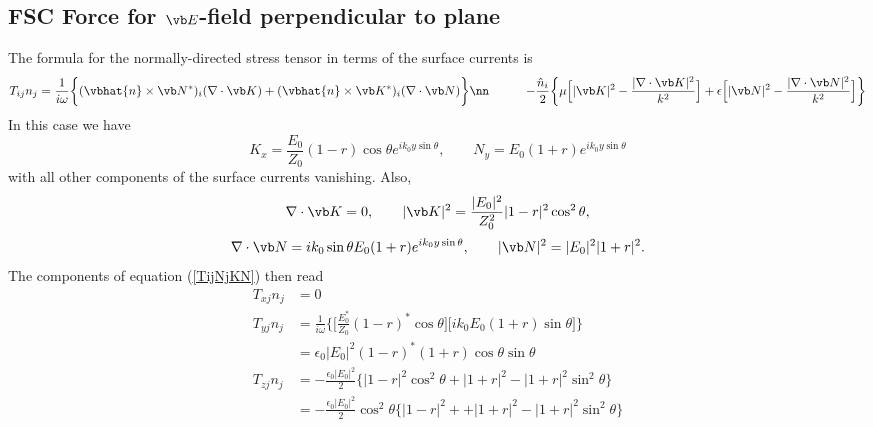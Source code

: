 \documentclass{article}
\begin{document}
\subsection*{FSC Force for $\vb E$-field perpendicular to plane}

The formula for the normally-directed stress tensor in terms of
the surface currents is 
\begin{align}
 T_{ij}n_j 
&= \frac{1}{i\omega}
   \bigg\{ (\vbhat{n} \times \vb N^*)_i(\nabla \cdot \vb K)
           +
           (\vbhat{n} \times \vb K^*)_i(\nabla \cdot \vb N)
   \bigg\}
\nn
&\qquad
 -\frac{\hat{n}_i}{2}
  \bigg\{      \mu\Big[ |\vb K|^2 - \frac{|\nabla \cdot \vb K|^2}{k^2}\Big]
         +\epsilon\Big[ |\vb N|^2 - \frac{|\nabla \cdot \vb N|^2}{k^2}\Big]
  \bigg\}
\label{TijNjKN}
\end{align}
In this case we have 
$$ K_x = \frac{E_0}{Z_0}(1-r)\cos\theta e^{ik_0 y \sin \theta},
   \qquad
   N_y = E_0(1+r)e^{ik_0 y \sin \theta}
$$ 
with all other components of the surface currents vanishing.
Also, 
$$ \nabla \cdot \vb K =0, 
   \qquad 
   |\vb K|^2 = \frac{|E_0|^2}{Z_0^2}|1-r|^2\cos^2\theta, 
$$
$$
   \nabla \cdot \vb N = ik_0 \sin\theta E_0 (1+r)e^{ik_0 y\sin\theta}, 
   \qquad 
   |\vb N|^2 = |E_0|^2|1+r|^2.
$$
The components of equation (\ref{TijNjKN}) then read
\begin{align*}
 T_{xj} n_{j}
&=0
\\
 T_{yj} n_{j}
&=\frac{1}{i\omega}\bigg\{ \Big[\frac{E_0^*}{Z_0}(1-r)^* \cos\theta \Big]
                           \Big[ik_0 E_0(1+r) \sin\theta\Big]\bigg\}
\\
&=\epsilon_0 |E_0|^2 (1-r)^*(1+r) \cos\theta\sin\theta
\\
 T_{zj} n_{j}
&=-\frac{\epsilon_0 |E_0|^2}{2}
   \Big\{  |1-r|^2 \cos^2\theta
          +|1+r|^2 
          -|1+r|^2 \sin^2\theta \Big\}
\\
&=-\frac{\epsilon_0 |E_0|^2}{2}\cos^2\theta 
   \Big\{  |1-r|^2 + 
          +|1+r|^2 
          -|1+r|^2 \sin^2\theta 
   \Big\}
\end{align*}
 
\end{document}
